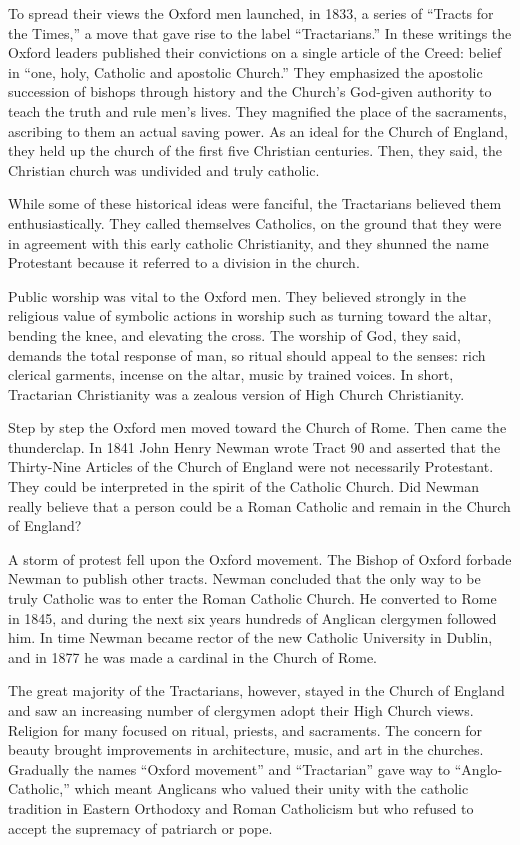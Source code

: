 To spread their views the Oxford men launched, in 1833, a series of “Tracts for the Times,” a move
that gave rise to the label “Tractarians.” In these writings the Oxford leaders published their
convictions on a single article of the Creed: belief in “one, holy, Catholic and apostolic Church.”
They emphasized the apostolic succession of bishops through history and the Church’s God-given
authority to teach the truth and rule men’s lives. They magnified the place of the sacraments,
ascribing to them an actual saving power. As an ideal for the Church of England, they held up the
church of the first five Christian centuries. Then, they said, the Christian church was undivided
and truly catholic.

While some of these historical ideas were fanciful, the Tractarians believed them enthusiastically.
They called themselves Catholics, on the ground that they were in agreement with this early catholic
Christianity, and they shunned the name Protestant because it referred to a division in the church.

Public worship was vital to the Oxford men. They believed strongly in the religious value of
symbolic actions in worship such as turning toward the altar, bending the knee, and elevating the
cross. The worship of God, they said, demands the total response of man, so ritual should appeal to
the senses: rich clerical garments, incense on the altar, music by trained voices. In short,
Tractarian Christianity was a zealous version of High Church Christianity.

Step by step the Oxford men moved toward the Church of Rome. Then came the thunderclap. In 1841 John
Henry Newman wrote Tract 90 and asserted that the Thirty-Nine Articles of the Church of England were
not necessarily Protestant. They could be interpreted in the spirit of the Catholic Church. Did
Newman really believe that a person could be a Roman Catholic and remain in the Church of England?

A storm of protest fell upon the Oxford movement. The Bishop of Oxford forbade Newman to publish
other tracts. Newman concluded that the only way to be truly Catholic was to enter the Roman
Catholic Church. He converted to Rome in 1845, and during the next six years hundreds of Anglican
clergymen followed him. In time Newman became rector of the new Catholic University in Dublin, and
in 1877 he was made a cardinal in the Church of Rome.

The great majority of the Tractarians, however, stayed in the Church of England and saw an
increasing number of clergymen adopt their High Church views. Religion for many focused on ritual,
priests, and sacraments. The concern for beauty brought improvements in architecture, music, and art
in the churches. Gradually the names “Oxford movement” and “Tractarian” gave way to
“Anglo-Catholic,” which meant Anglicans who valued their unity with the catholic tradition in
Eastern Orthodoxy and Roman Catholicism but who refused to accept the supremacy of patriarch or
pope.

